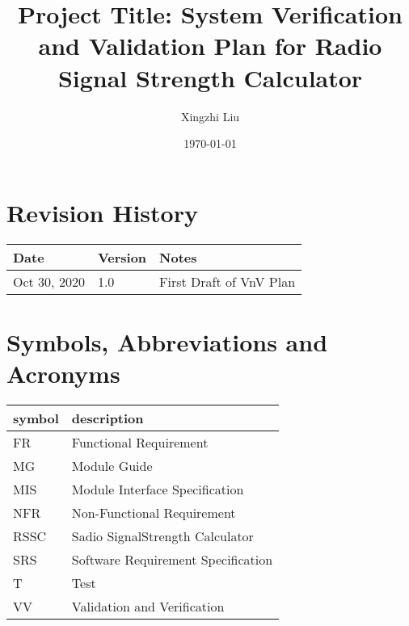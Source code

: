 \documentclass[12pt, titlepage]{article}
\begin{document}
\title{Project Title: System Verification and Validation Plan for Radio Signal Strength Calculator} 
\author{Xingzhi Liu}
\date{\today}
	
\maketitle


\section{Revision History}

\begin{tabularx}{\textwidth}{p{3cm}p{2cm}X}
\toprule {\bf Date} & {\bf Version} & {\bf Notes}\\
\midrule
Oct 30, 2020 & 1.0 & First Draft of VnV Plan\\
\bottomrule
\end{tabularx}

\newpage

\tableofcontents

\listoftables

\listoffigures

\newpage

\section{Symbols, Abbreviations and Acronyms}

\renewcommand{\arraystretch}{1.2}
\begin{tabular}{l l} 
  \toprule		
  \textbf{symbol} & \textbf{description}\\
  \midrule 
  FR & Functional Requirement\\
  MG & Module Guide\\
  MIS & Module Interface Specification\\
  NFR & Non-Functional Requirement\\
  RSSC & Sadio SignalStrength Calculator\\
  SRS & Software Requirement Specification\\
  T & Test\\
  VV & Validation and Verification\\
  \bottomrule
\end{tabular}\\

\newpage

\end{document}
